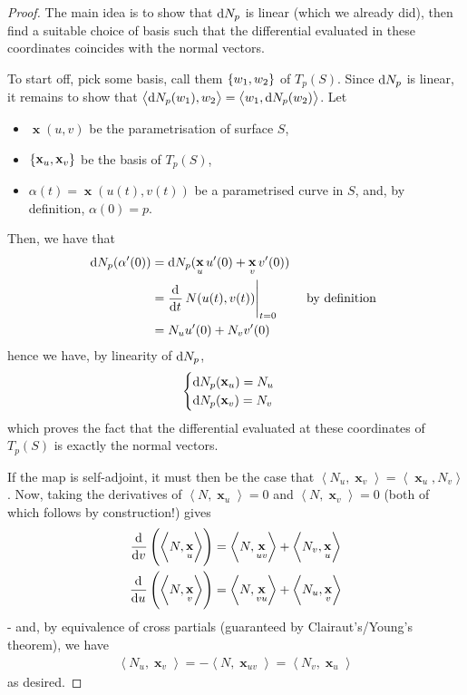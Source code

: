 \documentclass{amsart} %
\theoremstyle{mytheoremstyle}
\theoremstyle{definition}
\numberwithin{equation}{section}
\DeclareMathOperator{\1}{\mathbbm{1}}
\DeclareMathOperator{\D}{\dif}
\DeclareMathOperator{\x}{\mathbf{x}}
\newcommand{\innerproduct}[2]{\left\langle #1,#2 \right\rangle}
\begin{document}
\begin{proof}
	The main idea is to show that $\D N_p$ is linear (which we already did), then find a suitable choice of basis such that the differential evaluated in these coordinates coincides with the normal vectors.
	
	To start off, pick some basis, call them $\set{w_1,w_2}$ of $T_p (S)$. Since $\D N_p$ is linear, it remains to show that $\innerproduct{\D N_p (w_1)}{w_2} = \innerproduct{ w_1}{ \D N_p(w_2)}$. Let
	\begin{itemize}
		\item $\x(u,v)$ be the parametrisation of surface $S$,
		\item $\set{\x_u,\x_v}$ be the basis of $T_p (S)$,
		\item $\alpha(t) = \x(u(t),v(t))$ be a parametrised curve in $S$, and, by definition, $\alpha(0) = p$.
	\end{itemize}
	Then, we have that 
	\begin{align*}
	\D N_p (\alpha'(0)) &= \D N_p (\x_u u'(0) + \x_v v'(0) ) & \\
	&= \dod{}{t} \eval{N(u(t),v(t))}_{t=0} & \text{ by definition } \\
	&= N_u u'(0) + N_v v'(0) &
	\end{align*}
	hence we have, by linearity of $\D N_p$, 
	\begin{align*}
	\begin{cases}
		\D N_p (\x_u) = N_u \\
		\D N_p (\x_v) = N_v
	\end{cases}
	\end{align*}
	which proves the fact that the differential evaluated at these coordinates of $T_p (S)$ is exactly the normal vectors.
	
	If the map is self-adjoint, it must then be the case that $\innerproduct{N_u}{\x_v} = \innerproduct{\x_u}{N_v}$. Now, taking the derivatives of $\innerproduct{N}{\x_u} = 0$ and $ \innerproduct{N}{\x_v} = 0$ (both of which follows by construction!) gives
	\begin{align*}
		\dod{}{v} \left(\innerproduct{N}{\x_u}  \right) &= \innerproduct{N}{\x_{uv}} + \innerproduct{N_v}{\x_u} \\
		\dod{}{u} \left(\innerproduct{N}{\x_v}  \right) &= \innerproduct{N}{\x_{vu}} + \innerproduct{N_u}{\x_v}
	\end{align*}-
	and, by equivalence of cross partials (guaranteed by Clairaut's/Young's theorem), we have
	\begin{align*}
		\innerproduct{N_u}{\x_v} = -\innerproduct{N}{\x_{uv}}  = \innerproduct{N_v}{\x_u} 
	\end{align*}
	as desired.
\end{proof}
\end{document}
